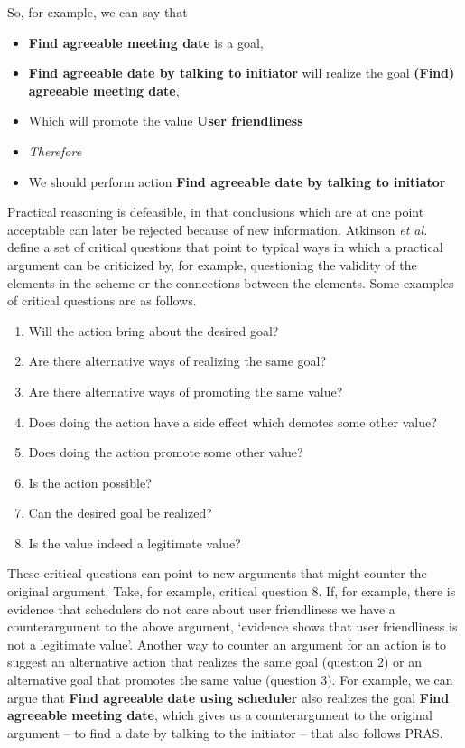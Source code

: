 So, for example, we can say that 
\begin{itemize}
\item[] \textbf{Find agreeable meeting date} is a goal,
\item[] \textbf{Find agreeable date by talking to initiator} will realize the goal \textbf{(Find) agreeable meeting date},
\item[] Which will promote the value \textbf{User friendliness}
\item[] \textit{Therefore} 
\item[] We should perform action \textbf{Find agreeable date by talking to initiator}
\end{itemize}

Practical reasoning is defeasible, in that conclusions which are at one point acceptable can later be rejected because of new information. Atkinson \emph{et al.}~\cite{atkinson2007} define a set of critical questions that point to typical ways in which a practical argument can be criticized by, for example, questioning the validity of the elements in the scheme or the connections between the elements. Some examples of critical questions are as follows.

\begin{enumerate}
\item Will the action bring about the desired goal?
\item Are there alternative ways of realizing the same goal?
\item Are there alternative ways of promoting the same value?
\item Does doing the action have a side effect which demotes some other value?
\item Does doing the action promote some other value?
\item Is the action possible?
\item Can the desired goal be realized?
\item Is the value indeed a legitimate value?
\end{enumerate}

These critical questions can point to new arguments that might counter the original argument. Take, for example, critical question 8. If, for example, there is evidence that schedulers do not care about user friendliness we have a counterargument to the above argument, `evidence shows that \textsf{user friendliness} is not a legitimate value'. Another way to counter an argument for an action is to suggest an alternative action that realizes the same goal (question 2) or an alternative goal that promotes the same value (question 3). For example, we can argue that \textbf{Find agreeable date using scheduler} also realizes the goal \textbf{Find agreeable meeting date}, which gives us a counterargument to the original argument -- to find a date by talking to the initiator -- that also follows PRAS. 

